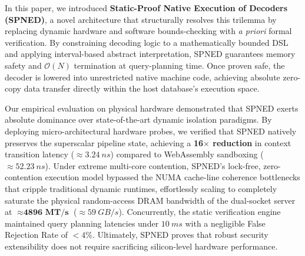 \documentclass[onecolumn]{IEEEtran}
\numberwithin{equation}{section}
\theoremstyle{definition}
\theoremstyle{remark}
\begin{document}
In this paper, we introduced \textbf{Static-Proof Native Execution of Decoders (SPNED)}, a novel architecture that structurally resolves this trilemma by replacing dynamic hardware and software bounds-checking with \textit{a priori} formal verification. By constraining decoding logic to a mathematically bounded DSL and applying interval-based abstract interpretation, SPNED guarantees memory safety and $\mathcal{O}(N)$ termination at query-planning time. Once proven safe, the decoder is lowered into unrestricted native machine code, achieving absolute zero-copy data transfer directly within the host database's execution space. 

Our empirical evaluation on physical hardware demonstrated that SPNED exerts absolute dominance over state-of-the-art dynamic isolation paradigms. By deploying micro-architectural hardware probes, we verified that SPNED natively preserves the superscalar pipeline state, achieving a \textbf{16$\times$ reduction} in context transition latency ($\approx \SI{3.24}{ns}$) compared to WebAssembly sandboxing ($\approx \SI{52.23}{ns}$). Under extreme multi-core contention, SPNED's lock-free, zero-contention execution model bypassed the NUMA cache-line coherence bottlenecks that cripple traditional dynamic runtimes, effortlessly scaling to completely saturate the physical random-access DRAM bandwidth of the dual-socket server at $\approx \textbf{4896 MT/s}$ (\textbf{$\approx \SI{59}{GB/s}$}). Concurrently, the static verification engine maintained query planning latencies under $\SI{10}{ms}$ with a negligible False Rejection Rate of $<4\%$. Ultimately, SPNED proves that robust security extensibility does not require sacrificing silicon-level hardware performance.
\end{document}
